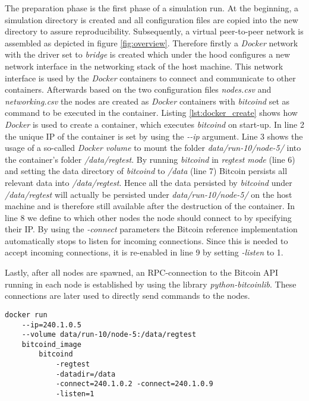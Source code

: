 The preparation phase is the first phase of a simulation run.
At the beginning, a simulation directory is created and all configuration files are copied into the new directory to assure reproducibility.
Subsequently, a virtual peer-to-peer network is assembled as depicted in figure \ref{fig:overview}.
Therefore firstly a \textit{Docker} network with the driver set to \textit{bridge} is created which under the hood configures a new network interface in the networking stack of the host machine.
This network interface is used by the \textit{Docker} containers to connect and communicate to other containers.
Afterwards based on the two configuration files \textit{nodes.csv} and \textit{networking.csv} the nodes are created as \textit{Docker} containers with \textit{bitcoind} set as command to be executed in the container.
Listing \ref{lst:docker_create} shows how \textit{Docker} is used to create a container, which executes \textit{bitcoind} on start-up.
In line 2 the unique IP of the container is set by using the \textit{-{}-ip} argument.
Line 3 shows the usage of a so-called \textit{Docker volume} to mount the folder \textit{data/run-10/node-5/} into the container's folder \textit{/data/regtest}.
By running \textit{bitcoind} in \textit{regtest mode} (line 6) and setting the data directory of \textit{bitcoind} to \textit{/data} (line 7) Bitcoin persists all relevant data into \textit{/data/regtest}.
Hence all the data persisted by \textit{bitcoind} under \textit{/data/regtest} will actually be persisted under \textit{data/run-10/node-5/} on the host machine and is therefore still available after the destruction of the container.
In line 8 we define to which other nodes the node should connect to by specifying their IP.
By using the \textit{-connect} parameters the Bitcoin reference implementation automatically stops to listen for incoming connections.
Since this is needed to accept incoming connections, it is re-enabled in line 9 by setting \textit{-listen} to 1.

Lastly, after all nodes are spawned, an RPC-connection to the Bitcoin API running in each node is established by using the library \textit{python-bitcoinlib}.
These connections are later used to directly send commands to the nodes.

\begin{minipage}{\linewidth}
\begin{lstlisting}[caption=Simplified version of how a node is started with \textit{Docker} and \textit{bitcoind}, label={lst:docker_create}, basicstyle=\ttfamily, captionpos=b]
docker run
	--ip=240.1.0.5
	--volume data/run-10/node-5:/data/regtest
	bitcoind_image
		bitcoind
			-regtest
			-datadir=/data
			-connect=240.1.0.2 -connect=240.1.0.9
			-listen=1
\end{lstlisting}
\end{minipage}
	
